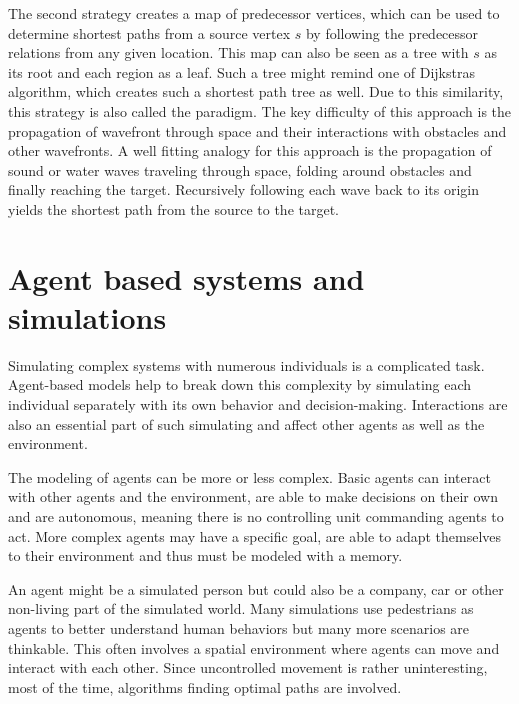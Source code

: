 	The second strategy creates a map of predecessor vertices, which can be used to determine shortest paths from a source vertex $s$ by following the predecessor relations from any given location.
	This map can also be seen as a tree with $s$ as its root and each region as a leaf.
	Such a tree might remind one of Dijkstras algorithm, which creates such a shortest path tree as well.
	Due to this similarity, this strategy is also called the  paradigm\cite[648]{mitchell-discrete-geodesic}.
	The key difficulty of this approach is the propagation of wavefront through space and their interactions with obstacles and other wavefronts\cite[3]{hershberger-suri}.
	A well fitting analogy for this approach is the propagation of sound or water waves traveling through space, folding around obstacles and finally reaching the target.
	Recursively following each wave back to its origin yields the shortest path from the source to the target.

\section{Agent based systems and simulations}

	Simulating complex systems with numerous individuals is a complicated task.
	Agent-based models help to break down this complexity by simulating each individual separately with its own behavior and decision-making. \cite{macal2014introductory}
	Interactions are also an essential part of such simulating and affect other agents as well as the environment.
	
	The modeling of agents can be more or less complex.
	Basic agents can interact with other agents and the environment, are able to make decisions on their own and are autonomous, meaning there is no controlling unit commanding agents to act.
	More complex agents may have a specific goal, are able to adapt themselves to their environment and thus must be modeled with a memory.
	
	An agent might be a simulated person but could also be a company, car or other non-living part of the simulated world.
	Many simulations use pedestrians as agents to better understand human behaviors but many more scenarios are thinkable\cite[8]{macal2014introductory}.
	This often involves a spatial environment where agents can move and interact with each other.
	Since uncontrolled movement is rather uninteresting, most of the time, algorithms finding optimal paths are involved\cite{kneidl-borrmann-hartmann-navigation,gloor-hybrid-pedestrian-routing,teknomo-millonig-routing}.
	
